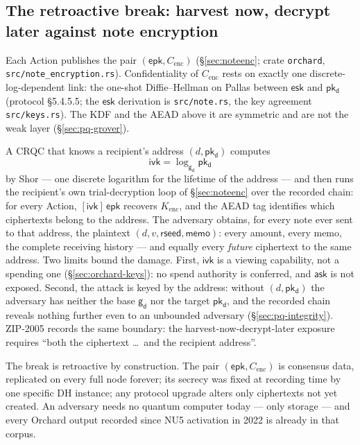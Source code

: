 \documentclass[11pt,a4paper]{article}
\theoremstyle{definition}
\newcommand{\ask}{\ensuremath{\mathsf{ask}}}
\newcommand{\ivk}{\ensuremath{\mathsf{ivk}}}
\newcommand{\pkd}{\ensuremath{\mathsf{pk_d}}}
\newcommand{\gd}{\ensuremath{\mathsf{g_d}}}
\begin{document}
\subsection{The retroactive break: harvest now, decrypt later against note
encryption}\label{sec:pq-hndl}

Each Action publishes the pair $(\mathsf{epk}, C_{\mathrm{enc}})$
(\S\ref{sec:noteenc}; crate \texttt{orchard},
\texttt{src/note\_encryption.rs}). Confidentiality of $C_{\mathrm{enc}}$ rests
on exactly one discrete-log-dependent link: the one-shot Diffie--Hellman on
Pallas between $\mathsf{esk}$ and $\pkd$ (protocol \S5.4.5.5; the
$\mathsf{esk}$ derivation is \texttt{src/note.rs}, the key agreement
\texttt{src/keys.rs}). The KDF and the AEAD above it are symmetric and are not
the weak layer (\S\ref{sec:pq-grover}).

A CRQC that knows a recipient's address $(d, \pkd)$ computes
\[
\ivk = \log_{\gd} \pkd
\]
by Shor --- one discrete logarithm for the lifetime of the address --- and then
runs the recipient's own trial-decryption loop of \S\ref{sec:noteenc} over the
recorded chain: for every Action, $[\ivk]\,\mathsf{epk}$ recovers
$K_{\mathrm{enc}}$, and the AEAD tag identifies which ciphertexts belong to the
address. The adversary obtains, for every note ever sent to that address, the
plaintext $(d, v, \mathsf{rseed}, \mathsf{memo})$: every amount, every memo,
the complete receiving history --- and equally every \emph{future} ciphertext
to the same address. Two limits bound the damage. First, $\ivk$ is a viewing
capability, not a spending one (\S\ref{sec:orchard-keys}): no spend authority
is conferred, and $\ask$ is not exposed. Second, the attack is keyed by the
address: without $(d, \pkd)$ the adversary has neither the base $\gd$ nor the
target $\pkd$, and the recorded chain reveals nothing further even to an
unbounded adversary (\S\ref{sec:pq-integrity}). ZIP-2005 records the same
boundary: the harvest-now-decrypt-later exposure requires ``both the
ciphertext \dots\ and the recipient address''.

The break is retroactive by construction. The pair
$(\mathsf{epk}, C_{\mathrm{enc}})$ is consensus data, replicated on every full
node forever; its secrecy was fixed at recording time by one specific DH
instance; any protocol upgrade alters only ciphertexts not yet created. An
adversary needs no quantum computer today --- only storage --- and every
Orchard output recorded since NU5 activation in 2022 is already in that
corpus.
\end{document}
